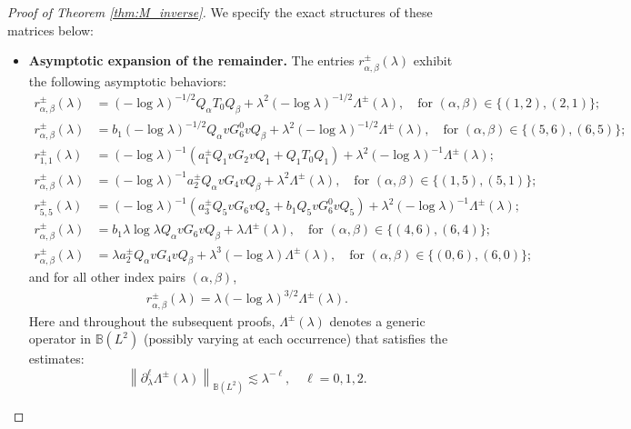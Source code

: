 \documentclass[reqno]{amsart}
\numberwithin{equation}{section}
\begin{document}
\begin{proof}[Proof of Theorem \ref{thm:M_inverse}]
	We specify the exact structures of these matrices below:
	\begin{itemize}
		\item \textbf{Asymptotic expansion of the remainder.} The entries $r_{\alpha,\beta}^{\pm}(\lambda)$ exhibit the following asymptotic behaviors:
		\begin{equation}\label{partial}
			\begin{split}
				r_{\alpha,\beta}^{\pm}(\lambda) &= (-\log \lambda)^{-1/2} Q_\alpha T_0 Q_\beta + \lambda^2 (-\log \lambda)^{-1/2} \Lambda^\pm(\lambda),
				\quad \text{for } (\alpha,\beta) \in \{(1,2), (2,1)\}; \\
                r_{\alpha,\beta}^{\pm}(\lambda) &= b_1 (-\log \lambda)^{-1/2} Q_\alpha v G_6^0 v Q_\beta + \lambda^2 (-\log \lambda)^{-1/2} \Lambda^\pm(\lambda),
				\quad \text{for } (\alpha,\beta) \in \{(5,6), (6,5)\}; \\
                r_{1,1}^{\pm}(\lambda) &= (-\log \lambda)^{-1} \left( a_1^{\pm} Q_1 v G_2 v Q_1 + Q_1 T_0 Q_1 \right) + \lambda^2 (-\log \lambda)^{-1} \Lambda^\pm(\lambda); \\
				r_{\alpha,\beta}^{\pm}(\lambda) &= (-\log \lambda)^{-1} a_2^\pm Q_\alpha v G_4 v Q_\beta + \lambda^2 \Lambda^\pm(\lambda),
				\quad \text{for } (\alpha,\beta) \in \{(1,5), (5,1)\};\\
                r_{5,5}^{\pm}(\lambda) &= (-\log \lambda)^{-1} \left( a_3^\pm Q_5 v G_6 v Q_5 + b_1 Q_5 v G_6^0 v Q_5 \right) + \lambda^2 (-\log \lambda)^{-1} \Lambda^\pm(\lambda); \\
        r_{\alpha,\beta}^\pm(\lambda) &= b_1 \lambda \log \lambda Q_\alpha v G_6 v Q_\beta + \lambda \Lambda^\pm(\lambda),
				\quad \text{for } (\alpha,\beta) \in \{(4,6), (6,4)\};\\
				r_{\alpha,\beta}^\pm(\lambda) &=  \lambda a_2^\pm Q_\alpha v G_4 v Q_\beta + \lambda^3 (-\log \lambda) \Lambda^\pm(\lambda),
				\quad \text{for } (\alpha,\beta) \in \{(0,6), (6,0)\};  
			\end{split}
		\end{equation}
		and for all other index pairs $(\alpha,\beta)$,
		\begin{align}\label{partial2}
			r_{\alpha,\beta}^{\pm}(\lambda) = \lambda (-\log \lambda)^{3/2} \Lambda^\pm(\lambda).
		\end{align}
			Here and throughout the subsequent proofs, $\Lambda^\pm(\lambda)$ denotes a generic operator in $\mathbb{B}(L^2)$ (possibly varying at each occurrence) that satisfies the estimates: 
	\[  
	\left\|\partial_\lambda^\ell \Lambda^\pm(\lambda)\right\|_{\mathbb{B}(L^2)} \lesssim \lambda^{-\ell}, \quad \ell = 0, 1, 2.  
	\]  
	 

\end{itemize}
\end{proof}
\end{document}
